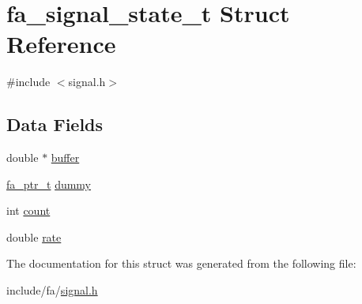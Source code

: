 \hypertarget{structfa__signal__state__t}{\section{fa\-\_\-signal\-\_\-state\-\_\-t Struct Reference}
\label{structfa__signal__state__t}
}


{\ttfamily \#include $<$signal.\-h$>$}

\subsection*{Data Fields}
\begin{DoxyCompactItemize}
\item 
double $\ast$ \hyperlink{group___fa_ga521763b11e76fad63a42a81bc54c9338}{buffer}
\item 
\hyperlink{group___fa_ga915ddeae99ad7568b273d2b876425197}{fa\-\_\-ptr\-\_\-t} \hyperlink{group___fa_ga8373ace5b07b8f2b4782b8c683334aa3}{dummy}
\item 
int \hyperlink{group___fa_ga657ec5752f5310e26b079c9e673f5fa3}{count}
\item 
double \hyperlink{group___fa_ga39e9a8f9c088b8b6fcb764de0d701cc6}{rate}
\end{DoxyCompactItemize}


The documentation for this struct was generated from the following file\-:\begin{DoxyCompactItemize}
\item 
include/fa/\hyperlink{signal_8h}{signal.\-h}\end{DoxyCompactItemize}
